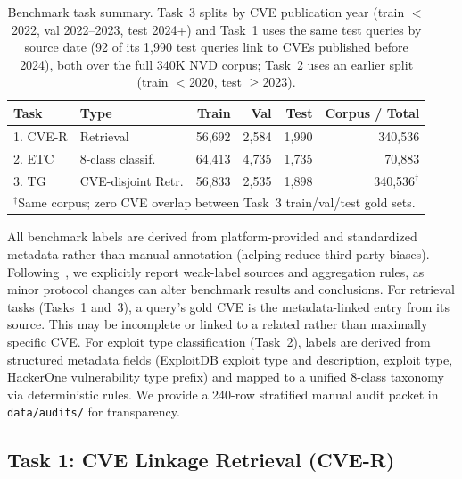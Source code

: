 \documentclass{article}
\begin{document}
\begin{table}[t]
\centering
\small
\caption{Benchmark task summary. Task~3 splits by CVE publication year (train $<$2022, val 2022--2023, test 2024+) and Task~1 uses the same test queries by source date (92 of its 1,990 test queries link to CVEs published before 2024), both over the full 340K NVD corpus; Task~2 uses an earlier split (train $<$2020, test $\geq$2023).}
\label{tab:task-summary}
\begin{tabular}{llrrrr}
\toprule
\textbf{Task} & \textbf{Type} & \textbf{Train} & \textbf{Val} & \textbf{Test} & \textbf{Corpus / Total} \\
\midrule
1. CVE-R & Retrieval & 56,692 & 2,584 & 1,990 & 340,536 \\
2. ETC & 8-class classif. & 64,413 & 4,735 & 1,735 & 70,883 \\
3. TG & CVE-disjoint Retr. & 56,833 & 2,535 & 1,898 & 340,536$^\dagger$ \\
\bottomrule
\multicolumn{6}{l}{\footnotesize $^\dagger$Same corpus; zero CVE overlap between Task~3 train/val/test gold sets.}
\end{tabular}
\end{table}

All benchmark labels are derived from platform-provided and standardized metadata rather than manual annotation (helping reduce third-party biases). Following~\citet{zhang2021wrench}, we explicitly report weak-label sources and aggregation rules, as minor protocol changes can alter benchmark results and conclusions. For retrieval tasks (Tasks~1 and~3), a query's gold CVE is the metadata-linked entry from its source. This may be incomplete or linked to a related rather than maximally specific CVE. For exploit type classification (Task~2), labels are derived from structured metadata fields (ExploitDB exploit type and description, exploit type, HackerOne vulnerability type prefix) and mapped to a unified 8-class taxonomy via deterministic rules. We provide a 240-row stratified manual audit packet in \texttt{data/audits/} for transparency.

\subsection{Task 1: CVE Linkage Retrieval (CVE-R)}
\label{sec:task1}
\end{document}
